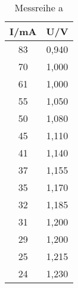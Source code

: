 

\begin{table}[h!]
  \centering
  \caption{Messreihe a}
  \label{tab:Mono}
  \begin{tabular}{c c }
    \toprule
     I/mA &	 U/V	   \\
    \midrule
   83  & 0,940	\\
   70  & 1,000	\\
   61  & 1,000	\\
   55  & 1,050	\\
   50  & 1,080	\\
   45  & 1,110	\\
   41  & 1,140	\\
   37  & 1,155	\\
   35  & 1,170	\\
   32  & 1,185	\\
   31  & 1,200  \\
   29  & 1,200  \\
   25  & 1,215	\\
   24  & 1,230	\\

    \bottomrule
  \end{tabular}
\end{table}
